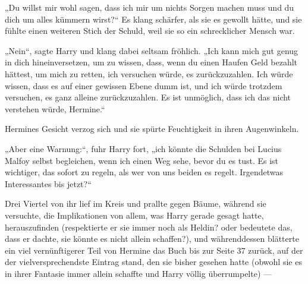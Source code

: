 „Du willst mir wohl sagen, dass ich mir um nichts Sorgen machen muss und du dich um alles kümmern wirst?“ Es klang schärfer, als sie es gewollt hätte, und sie fühlte einen weiteren Stich der Schuld, weil sie so ein schrecklicher Mensch war.

„Nein“, sagte Harry und klang dabei seltsam fröhlich.
„Ich kann mich gut genug in dich hineinversetzen, um zu wissen, dass, wenn du einen Haufen Geld bezahlt hättest, um mich zu retten, ich versuchen würde, es zurückzuzahlen. Ich würde wissen, dass es auf einer gewissen Ebene dumm ist, und ich würde trotzdem versuchen, es ganz alleine zurückzuzahlen. Es ist unmöglich, dass ich das nicht verstehen würde, Hermine.“

Hermines Gesicht verzog sich und sie spürte Feuchtigkeit in ihren Augenwinkeln.

„Aber eine Warnung:“, fuhr Harry fort, „ich könnte die Schulden bei Lucius Malfoy selbst begleichen, wenn ich einen Weg sehe, bevor du es tust. Es ist wichtiger, das sofort zu regeln, als wer von uns beiden es regelt. Irgendetwas Interessantes bis jetzt?“

Drei Viertel von ihr lief im Kreis und prallte gegen Bäume, während sie versuchte, die Implikationen von allem, was Harry gerade gesagt hatte, herauszufinden (respektierte er sie immer noch als Heldin? oder bedeutete das, dass er dachte, sie könnte es nicht allein schaffen?), und währenddessen blätterte ein viel vernünftigerer Teil von Hermine das Buch bis zur Seite 37 zurück, auf der der vielversprechendste Eintrag stand, den sie bisher gesehen hatte (obwohl sie es in ihrer Fantasie immer allein schaffte und Harry völlig überrumpelte) —

